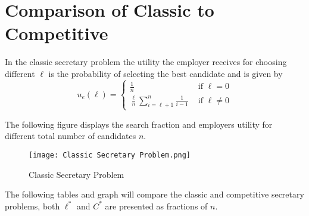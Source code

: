 \documentclass{article}
\begin{document}
\section{Comparison of Classic to Competitive}

In the classic secretary problem the utility the employer receives for choosing different $\ell$ is the probability of selecting the best candidate and is given by 
$$ u_e(\ell) =
\begin{cases}
    \frac{1}{n} & \text{ if } \ell = 0 \\
    \frac{\ell}{n} \sum_{i=\ell+1}^{n}\frac{1}{i-1} & \text{ if } \ell \neq 0
\end{cases}$$

The following figure displays the search fraction and employers utility for different total number of candidates $n$.


\begin{figure}[H]
\centering
\centering
\texttt{[image: Classic Secretary Problem.png]}
\caption{Classic Secretary Problem}
\label{fig:Classic_Secretary_Problem}
\end{figure}

The following tables and graph will compare the classic and competitive secretary problems, both $\ell^*$ and $C^*$ are presented as fractions of $n$.
\end{document}
